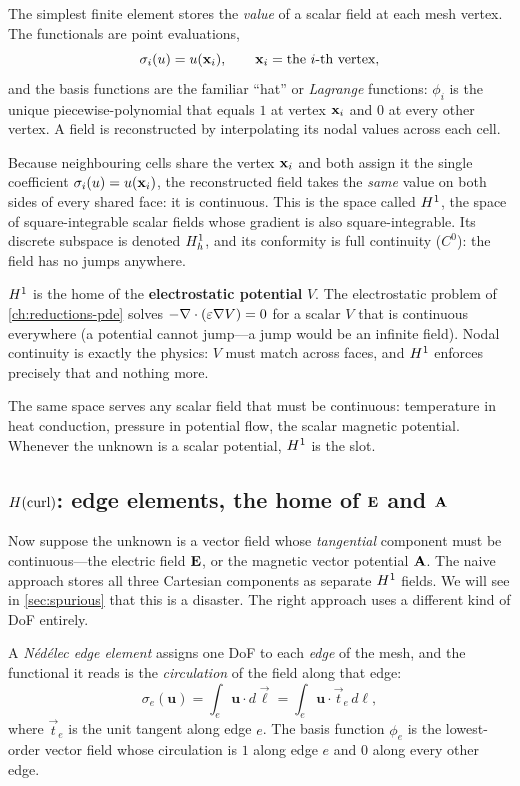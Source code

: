 The simplest finite element stores the \emph{value} of a scalar field at each mesh
vertex. The functionals are point evaluations,
\[
  \sigma_i(u) = u(\mathbf{x}_i), \qquad \mathbf{x}_i = \text{the $i$-th vertex,}
\]
and the basis functions are the familiar ``hat'' or \emph{Lagrange} functions:
$\phi_i$ is the unique piecewise-polynomial that equals $1$ at vertex $\mathbf{x}_i$ and
$0$ at every other vertex. A field is reconstructed by interpolating its nodal
values across each cell.

Because neighbouring cells share the vertex $\mathbf{x}_i$ and both assign it the single
coefficient $\sigma_i(u)=u(\mathbf{x}_i)$, the reconstructed field takes the \emph{same}
value on both sides of every shared face: it is continuous. This is the space
called $H^1$, the space of square-integrable scalar fields whose gradient is also
square-integrable. Its discrete subspace is denoted $H^1_h$, and its conformity is
full continuity ($C^0$): the field has no jumps anywhere.

\begin{physicsbox}
$H^1$ is the home of the \textbf{electrostatic potential} $V$. The electrostatic
problem of \cref{ch:reductions-pde} solves $-\nabla\cdot(\varepsilon\nabla V)=0$ for a
scalar $V$ that is continuous everywhere (a potential cannot jump---a jump would be
an infinite field). Nodal continuity is exactly the physics: $V$ must match across
faces, and $H^1$ enforces precisely that and nothing more.
\end{physicsbox}

The same space serves any scalar field that must be continuous: temperature in heat
conduction, pressure in potential flow, the scalar magnetic potential. Whenever the
unknown is a scalar potential, $H^1$ is the slot.

\subsection{$H(\mathrm{curl})$: edge elements, the home of $\mathbf{E}$ and $\mathbf{A}$}

Now suppose the unknown is a vector field whose \emph{tangential} component must be
continuous---the electric field $\mathbf{E}$, or the magnetic vector potential $\mathbf{A}$. The
naive approach stores all three Cartesian components as separate $H^1$ fields. We
will see in \cref{sec:spurious} that this is a disaster. The right approach uses a
different kind of DoF entirely.

A \emph{N\'ed\'elec edge element} assigns one DoF to each \emph{edge} of the mesh,
and the functional it reads is the \emph{circulation} of the field along that edge:
\[
  \sigma_e(\mathbf{u}) = \int_e \mathbf{u}\cdot d\vec\ell
  = \int_e \mathbf{u}\cdot\vec t_e \, d\ell,
\]
where $\vec t_e$ is the unit tangent along edge $e$. The basis function $\phi_e$ is
the lowest-order vector field whose circulation is $1$ along edge $e$ and $0$ along
every other edge.

